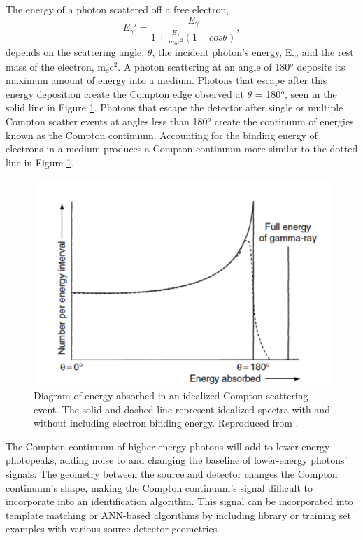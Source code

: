 The energy of a photon scattered off a free electron,
\begin{equation} \label{eq:compton_scatter}
E_{\gamma}' = \frac{E_{\gamma}}{1 + \frac{E_{\gamma}}{m_{0} c^2} (1-cos\theta)},
\end{equation}
depends on the scattering angle, $\theta$, the incident photon's energy, E$_{\gamma}$, and the rest mass of the electron, m$_{o}$c$^{2}$. A photon scattering at an angle of 180$^{o}$ deposits its maximum amount of energy into a medium. Photons that escape after this energy deposition create the Compton edge observed at $\theta$ = 180$^{o}$, seen in the solid line in Figure \ref{fig:ideal_compton}. Photons that escape the detector after single or multiple Compton scatter events at angles less than 180$^{o}$ create the continuum of energies known as the Compton continuum. Accounting for the binding energy of electrons in a medium produces a Compton continuum more similar to the dotted line in Figure \ref{fig:ideal_compton}.

\begin{figure}[H]
	\centering
	\includegraphics[width=0.75\linewidth]{images/ideal_compton}
	\caption{Diagram of energy absorbed in an idealized Compton scattering event. The solid and dashed line represent idealized spectra with and without including electron binding energy. Reproduced from \cite{gilmore}.}
	\label{fig:ideal_compton}
\end{figure}

The Compton continuum of higher-energy photons will add to lower-energy photopeaks, adding noise to and changing the baseline of lower-energy photons' signals. The geometry between the source and detector changes the Compton continuum's shape, making the Compton continuum's signal difficult to incorporate into an identification algorithm. This signal can be incorporated into template matching or ANN-based algorithms by including library or training set examples with various source-detector geometries.




